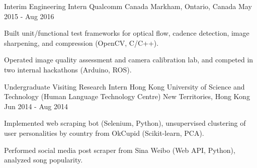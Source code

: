 \begin{cventries}
  \cventry
    {Interim Engineering Intern} %
    {Qualcomm Canada} %
    {Markham, Ontario, Canada} %
    {May 2015 - Aug 2016} %
    {
      \begin{cvitems} %
        \item {Built unit/functional test frameworks for optical flow, cadence detection, image sharpening, and compression (OpenCV, C/C++).}
        \item {Operated image quality assessment and camera calibration lab, and competed in two internal hackathons (Arduino, ROS).}
      \end{cvitems}
    }

  \cventry
    {Undergraduate Visiting Research Intern} %
    {Hong Kong University of Science and Technology (Human Language Technology Centre)} %
    {New Territories, Hong Kong} %
    {Jun 2014 - Aug 2014} %
    {
      \begin{cvitems} %
        \item {Implemented web scraping bot (Selenium, Python), unsupervised clustering of user personalities by country from OkCupid (Scikit-learn, PCA).}
        \item {Performed social media post scraper from Sina Weibo (Web API, Python), analyzed song popularity.}
      \end{cvitems}
    }

\end{cventries}
